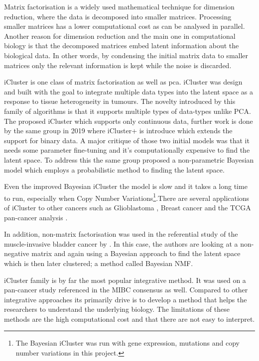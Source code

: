 Matrix factorisation is a widely used mathematical technique for dimension reduction, where the data is decomposed into smaller matrices. Processing smaller matrices has a lower computational cost as can be analysed in parallel. Another reason for dimension reduction and the main one in computational biology is that the decomposed matrices embed latent information about the biological data. In other words, by condensing the initial matrix data to smaller matrices only the relevant information is kept while the noise is discarded. 

iCluster \cite{Shen2009-ew, Mo2013-zi, Mo2018-el} is one class of matrix factorisation as well as \acrlong{pca}. iCluster was design and built with the goal to integrate multiple data types into the latent space as a response to tissue heterogeneity in tumours. The novelty introduced by this family of algorithms is that it supports multiple types of data-types unlike PCA. The \citet{Shen2009-ew} proposed iCluster which supports only continuous data, further work is done by the same group in 2019 \citet{Mo2013-zi} where iCluster+ is introduce which extends the support for binary data. A major critique of those two initial models was that it needs some parameter fine-tuning and it's computationally expensive to find the latent space. To address this the same group proposed a non-parametric Bayesian model \citet{Mo2018-el} which employs a probabilistic method to finding the latent space. 

Even the improved Bayesian iCluster the model is slow and it takes a long time to run, especially when Copy Number Variations\footnote{The Bayesian iCluster was run with gene expression, mutations and copy number variations in this project.}.There are several applications of iCluster to other cancers such as Glioblastoma \cite{Shen2012-yj},  Breast cancer \citet{Curtis2012-ff} and the TCGA pan-cancer analysis \citet{Hoadley2018-qe}.

In addition, non-matrix factorisation was used in the referential study of the muscle-invasive bladder cancer by \citet{Robertson2017-mg}. In this case, the authors are looking at a non-negative matrix and again using a Bayesian approach to find the latent space which is then later clustered; a method called Bayesian NMF.

iCluster family is by far the most popular integrative method. It was used on a pan-cancer \cite{Hoadley2018-qe} study referenced in the MIBC consensus \citet{Kamoun2020-tj} as well. Compared to other integrative approaches its primarily drive is to develop a method that helps the researchers to understand the underlying biology. The limitations of these methods are the high computational cost and that there are not easy to interpret.

